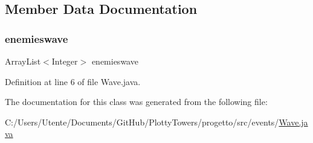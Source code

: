 \subsection{Member Data Documentation}
\mbox{\label{classevents_1_1_wave_af2cde6170a7bb973c8a1b5851deaa0e5}} 
\subsubsection{\texorpdfstring{enemieswave}{enemieswave}}
{\footnotesize\ttfamily Array\+List$<$Integer$>$ enemieswave\hspace{0.3cm}{\ttfamily [private]}}



Definition at line 6 of file Wave.\+java.



The documentation for this class was generated from the following file\+:\begin{DoxyCompactItemize}
\item 
C\+:/\+Users/\+Utente/\+Documents/\+Git\+Hub/\+Plotty\+Towers/progetto/src/events/\hyperlink{_wave_8java}{Wave.\+java}\end{DoxyCompactItemize}

